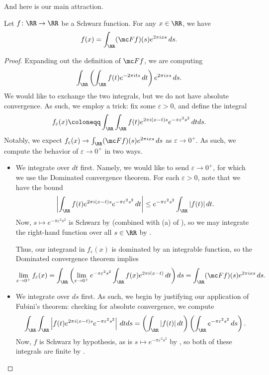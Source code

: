 \documentclass[notes.tex]{subfiles}
\begin{document}
And here is our main attraction.
\begin{theorem}
	Let $f\colon\RR\to\RR$ be a Schwarz function. For any $x\in\RR$, we have
	\[f(x)=\int_\RR(\mc Ff)(s)e^{2\pi ixs}\,ds.\]
\end{theorem}
\begin{proof}
	Expanding out the definition of $\mc Ff$, we are computing
	\[\int_\RR\left(\int_\RR f(t)e^{-2\pi its}\,dt\right)e^{2\pi ixs}\,ds.\]
	We would like to exchange the two integrals, but we do not have absolute convergence. As such, we employ a trick: fix some $\varepsilon>0$, and define the integral
	\[f_\varepsilon(x)\coloneqq\int_\RR\int_\RR f(t)e^{2\pi i(x-t)s}e^{-\pi\varepsilon^2s^2}\,dtds.\]
	Notably, we expect $f_\varepsilon(x)\to\int_\RR(\mc Ff)(s)e^{2\pi ixs}\,ds$ as $\varepsilon\to0^+$. As such, we compute the behavior of $\varepsilon\to0^+$ in two ways.
	\begin{itemize}
		\item We integrate over $dt$ first. Namely, we would like to send $\varepsilon\to0^+$, for which we use the Dominated convergence theorem. For each $\varepsilon>0$, note that we have the bound
		\[\left|\int_\RR f(t)e^{2\pi i(x-t)s}e^{-\pi\varepsilon^2s^2}\,dt\right|\le e^{-\pi\varepsilon^2s^2}\int_\RR|f(t)|\,dt.\]
		Now, $s\mapsto e^{-\pi\varepsilon^2s^2}$ is Schwarz by  (combined with (a) of ), so we may integrate the right-hand function over all $s\in\RR$ by .

		Thus, our integrand in $f_\varepsilon(x)$ is dominated by an integrable function, so the Dominated convergence theorem implies
		\[\lim_{\varepsilon\to0^+}f_\varepsilon(x)=\int_\RR\left(\lim_{\varepsilon\to0^+}e^{-\pi\varepsilon^2s^2}\int_\RR f(x)e^{2\pi i(x-t)}\,dt\right)ds=\int_\RR(\mc Ff)(s)e^{2\pi ixs}\,ds.\]
		\item We integrate over $ds$ first. As such, we begin by justifying our application of Fubini's theorem: checking for absolute convergence, we compute
		\[\int_\RR\int_\RR\left|f(t)e^{2\pi i(x-t)s}e^{-\pi\varepsilon^2s^2}\right|\,dtds=\left(\int_\RR|f(t)|\,dt\right)\left(\int_\RR e^{-\pi\varepsilon^2s^2}\,ds\right).\]
		Now, $f$ is Schwarz by hypothesis, as is $s\mapsto e^{-\pi\varepsilon^2s^2}$ by , so both of these integrals are finite by .


\end{itemize}
\end{proof}
\end{document}

